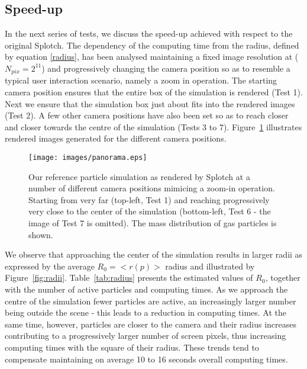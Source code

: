 \documentclass[1p]{elsarticle}
\begin{document}
\subsection{Speed-up}
\label{sec:speed-up}
In the next series of tests, we discuss the speed-up achieved with respect to the original Splotch. 
The dependency of the computing time from the radius, defined by equation \eqref{radius}, has been analysed maintaining a fixed image resolution at ($N_{pix} = 2^{11}$) and progressively changing the camera position 
so as to resemble a typical user interaction scenario, namely a zoom in operation. 
The starting camera position ensures that the entire box of the simulation is rendered (Test 1). 
Next we ensure that the simulation box just about fits into the rendered images (Test 2). 
A few other camera positions have also been set so as to reach closer and closer towards the 
centre of the simulation (Tests 3 to 7). Figure~\ref{fig:panorama} illustrates rendered images generated for the different camera positions.

\begin{figure}
\centering
\texttt{[image: images/panorama.eps]}
\caption{Our reference particle simulation as rendered by Splotch at a number of different camera positions mimicing a zoom-in operation. Starting from very far (top-left, Test 1) and reaching progressively very close to the center of the simulation (bottom-left, Test 6 - the image of Test 7 is omitted). The mass distribution of gas particles is shown.}
\label{fig:panorama}
\end{figure}

We observe that approaching the center of the simulation results in larger radii 
as expressed by the average $R_0=<r(p)>$ radius and illustrated by Figure~\ref{fig:radii}. 
Table~\ref{tab:radius} presents the estimated values of $R_0$, together with the number of active particles and computing times. As we approach the centre of the simulation fewer particles are active, an increasingly larger 
number being outside the scene - this leads to a reduction in computing times. At the same
time, however, particles are closer to the camera and their radius increases contributing to 
a progressively larger number of screen pixels,
thus increasing computing times with the square of their radius. 
These trends tend to compensate maintaining on average 10 to 16 seconds overall computing times.
\end{document}
